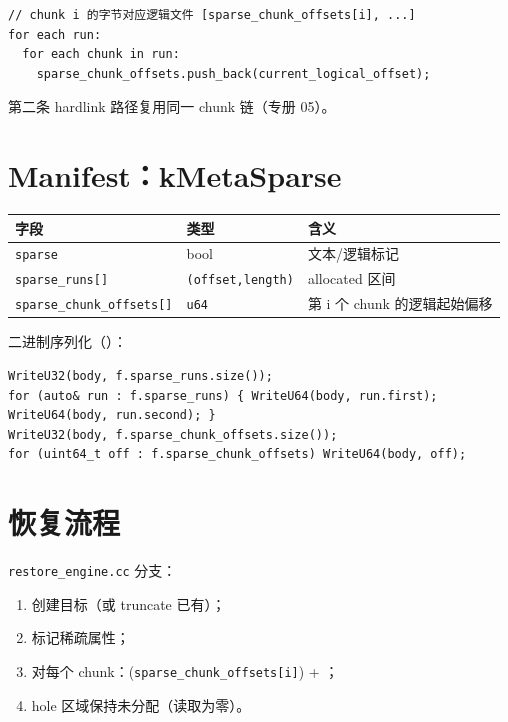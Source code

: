 \begin{lstlisting}[caption={sparse\_chunk\_offsets 含义（概念）}]
// chunk i 的字节对应逻辑文件 [sparse_chunk_offsets[i], ...]
for each run:
  for each chunk in run:
    sparse_chunk_offsets.push_back(current_logical_offset);
\end{lstlisting}

第二条 hardlink 路径复用同一 chunk 链（专册 05）。

\section{Manifest：kMetaSparse}

\begin{longtable}{@{}llp{7cm}@{}}
\toprule
字段 & 类型 & 含义 \\
\midrule
\texttt{sparse} & bool & 文本/逻辑标记 \\
\texttt{sparse\_runs[]} & \texttt{(offset,length)} & allocated 区间 \\
\texttt{sparse\_chunk\_offsets[]} & \texttt{u64} & 第 i 个 chunk 的逻辑起始偏移 \\
\bottomrule
\end{longtable}

二进制序列化（）：

\begin{lstlisting}[caption={kMetaSparse 写入}]
WriteU32(body, f.sparse_runs.size());
for (auto& run : f.sparse_runs) { WriteU64(body, run.first); WriteU64(body, run.second); }
WriteU32(body, f.sparse_chunk_offsets.size());
for (uint64_t off : f.sparse_chunk_offsets) WriteU64(body, off);
\end{lstlisting}

\section{恢复流程}

\texttt{restore\_engine.cc} 分支：

\begin{enumerate}
  \item {} 创建目标（或 truncate 已有）；
  \item {} 标记稀疏属性；
  \item 对每个 chunk：(\texttt{sparse\_chunk\_offsets[i]}) + ；
  \item hole 区域保持未分配（读取为零）。
\end{enumerate}


